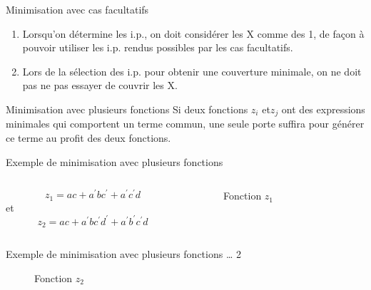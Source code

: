 \documentclass[presentation]{beamer}
\begin{document}
\begin{frame}[label={sec:orgcf5efde}]{Minimisation avec cas facultatifs}
\begin{enumerate}
\item Lorsqu'on détermine les i.p., on doit considérer les X comme des
1, de façon à pouvoir utiliser les i.p. rendus possibles par les
cas facultatifs.

\item Lors de la sélection des i.p. pour obtenir une couverture
minimale, on ne doit pas ne pas essayer de couvrir les X.
\end{enumerate}
\end{frame}

\begin{frame}[label={sec:org59a73cc}]{Minimisation avec plusieurs fonctions}
Si deux fonctions \(z_i\) et\(z_j\) ont des expressions minimales qui comportent un terme commun, une seule porte suffira pour générer ce terme au profit des deux fonctions.
\end{frame}

\begin{frame}[label={sec:orgdb74c14}]{Exemple de minimisation avec plusieurs fonctions}
\begin{columns}
\begin{column}{0.48\columnwidth}
\begin{block}{}
$$z_1 = a c + a^{\prime} b c^{\prime} + a^{\prime} c^{\prime} d$$ et 
$$z_2 = a c + a^{\prime}  b c^{\prime} d^{\prime} +
a^{\prime} b^{\prime} c^{\prime} d$$
\end{block}
\end{column}

\begin{column}{0.48\columnwidth}
\begin{block}{}
\begin{figure}[htbp]
\centering

\caption{\label{fig:orgdf103a4}Fonction \(z_1\)}
\end{figure}
\end{block}
\end{column}
\end{columns}
\end{frame}

\begin{frame}[label={sec:org9796349}]{Exemple de minimisation avec plusieurs fonctions \ldots{} 2}
\begin{figure}[htbp]
\centering

\caption{\label{fig:orgfaa81ad}Fonction \(z_2\)}
\end{figure}
\end{frame}
\end{document}
